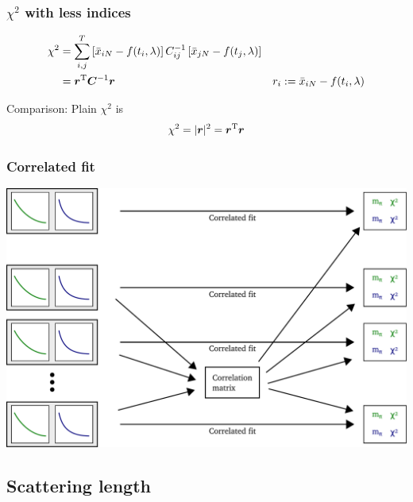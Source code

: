 \documentclass[english, fleqn]{beamer}
\begin{document}
\begin{frame}
    \frametitle{$\chi^2$ with less indices}

    \begin{align*}
        \chi^2
        &= \sum_{i, j}^T
        \left[ \bar x_{iN} - f(t_i, \lambda) \right]
        C^{-1}_{ij}
        \left[ \bar x_{jN} - f(t_j, \lambda) \right] \\
        &= 
        \vec r^{\text T}
        \vec C^{-1}
        \vec r
        &
        r_i := \bar x_{iN} - f(t_i, \lambda)
        \\
    \end{align*}

    Comparison: Plain $\chi^2$ is
    \[
        \chi^2 = |\vec r|^2 = \vec r^{\text T} \vec r
    \]
\end{frame}

\begin{frame}
    \frametitle{Correlated fit}
    \begin{center}
        \includegraphics[scale=\scale]{sketches/06-fit.pdf}
    \end{center}
\end{frame}

\subsection{Scattering length}
\end{document}
